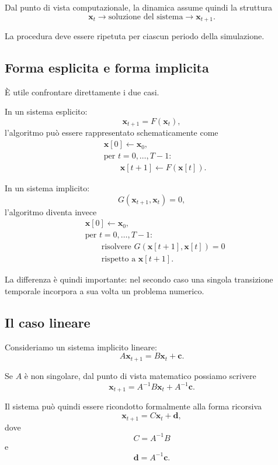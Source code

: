 \documentclass{book}
\begin{document}
Dal punto di vista computazionale, la dinamica assume quindi la struttura
\[
\mathbf{x}_t
\longrightarrow
\boxed{\text{soluzione del sistema}}
\longrightarrow
\mathbf{x}_{t+1}.
\]

La procedura deve essere ripetuta per ciascun periodo della simulazione.


\subsection{Forma esplicita e forma implicita}

È utile confrontare direttamente i due casi.

In un sistema esplicito:
\[
\mathbf{x}_{t+1}=F(\mathbf{x}_t),
\]
l'algoritmo può essere rappresentato schematicamente come
\[
\begin{aligned}
&\mathbf{x}[0]\leftarrow\mathbf{x}_0,\\
&\text{per }t=0,\ldots,T-1:\\
&\qquad
\mathbf{x}[t+1]\leftarrow
F(\mathbf{x}[t]).
\end{aligned}
\]

In un sistema implicito:
\[
G(\mathbf{x}_{t+1},\mathbf{x}_t)=0,
\]
l'algoritmo diventa invece
\[
\begin{aligned}
&\mathbf{x}[0]\leftarrow\mathbf{x}_0,\\
&\text{per }t=0,\ldots,T-1:\\
&\qquad
\text{risolvere }
G(\mathbf{x}[t+1],\mathbf{x}[t])=0
\\
&\qquad
\text{rispetto a }\mathbf{x}[t+1].
\end{aligned}
\]

La differenza è quindi importante: nel secondo caso una singola
transizione temporale incorpora a sua volta un problema numerico.


\subsection{Il caso lineare}

Consideriamo un sistema implicito lineare:
\[
A\mathbf{x}_{t+1}
=
B\mathbf{x}_t+\mathbf{c}.
\]

Se $A$ è non singolare, dal punto di vista matematico possiamo scrivere
\[
\mathbf{x}_{t+1}
=
A^{-1}B\mathbf{x}_t
+
A^{-1}\mathbf{c}.
\]

Il sistema può quindi essere ricondotto formalmente alla forma ricorsiva
\[
\mathbf{x}_{t+1}
=
C\mathbf{x}_t+\mathbf{d},
\]
dove
\[
C=A^{-1}B
\]
e
\[
\mathbf{d}=A^{-1}\mathbf{c}.
\]
\end{document}
